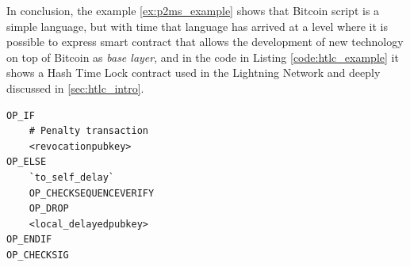 In conclusion, the example \ref{ex:p2ms_example} shows that Bitcoin script is a simple
language, but with time that language has arrived at a level where it is possible to
express smart contract that allows the development of new technology on top of Bitcoin as \emph{base layer},
and in the code in Listing \ref{code:htlc_example} it shows a Hash Time Lock contract used in the Lightning Network 
and deeply discussed in \ref{sec:htlc_intro}.


\begin{lstlisting}[language=bitcoinscript, caption={Hash Time Lock contract first example.}, label={code:htlc_example}]
OP_IF
    # Penalty transaction
    <revocationpubkey>
OP_ELSE
    `to_self_delay`
    OP_CHECKSEQUENCEVERIFY
    OP_DROP
    <local_delayedpubkey>
OP_ENDIF
OP_CHECKSIG
\end{lstlisting}



